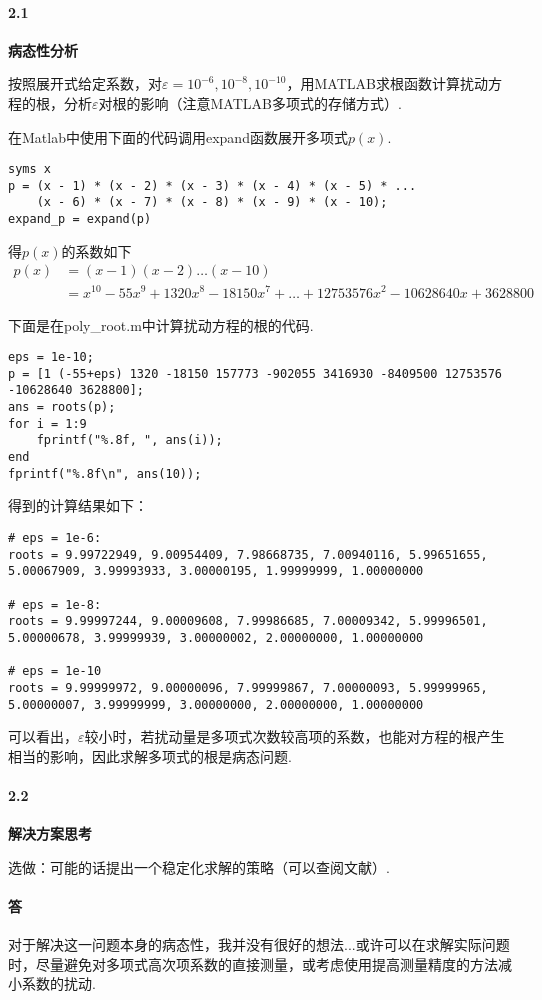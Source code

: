 \paragraph{2.1} \textbf{病态性分析}
\par 按照展开式给定系数，对$\varepsilon = 10^{-6}, 10^{-8}, 10^{-10}$，用MATLAB求根函数计算扰动方程的根，分析$\varepsilon$对根的影响（注意MATLAB多项式的存储方式）.
\par 在Matlab中使用下面的代码调用expand函数展开多项式$p(x)$.
\begin{lstlisting}
syms x
p = (x - 1) * (x - 2) * (x - 3) * (x - 4) * (x - 5) * ...
    (x - 6) * (x - 7) * (x - 8) * (x - 9) * (x - 10);
expand_p = expand(p)
\end{lstlisting}
\par 得$p(x)$的系数如下
\[\begin{split}
p(x) & = (x - 1)(x - 2)\dots(x - 10) \\
& = x^{10} - 55 x^9 + 1320 x^8 - 18150 x^7 + \dots + 12753576 x^2 - 10628640 x + 3628800
\end{split}\]
\par 下面是在poly\_root.m中计算扰动方程的根的代码.
\begin{lstlisting}
eps = 1e-10;
p = [1 (-55+eps) 1320 -18150 157773 -902055 3416930 -8409500 12753576 -10628640 3628800];
ans = roots(p);
for i = 1:9
    fprintf("%.8f, ", ans(i));
end
fprintf("%.8f\n", ans(10));
\end{lstlisting}
得到的计算结果如下：
\begin{lstlisting}
# eps = 1e-6:
roots = 9.99722949, 9.00954409, 7.98668735, 7.00940116, 5.99651655, 5.00067909, 3.99993933, 3.00000195, 1.99999999, 1.00000000

# eps = 1e-8:
roots = 9.99997244, 9.00009608, 7.99986685, 7.00009342, 5.99996501, 5.00000678, 3.99999939, 3.00000002, 2.00000000, 1.00000000

# eps = 1e-10
roots = 9.99999972, 9.00000096, 7.99999867, 7.00000093, 5.99999965, 5.00000007, 3.99999999, 3.00000000, 2.00000000, 1.00000000
\end{lstlisting}
可以看出，$\varepsilon$较小时，若扰动量是多项式次数较高项的系数，也能对方程的根产生相当的影响，因此求解多项式的根是病态问题.

\paragraph{2.2} \textbf{解决方案思考}
\par 选做：可能的话提出一个稳定化求解的策略（可以查阅文献）.
\paragraph{答} 对于解决这一问题本身的病态性，我并没有很好的想法...或许可以在求解实际问题时，尽量避免对多项式高次项系数的直接测量，或考虑使用提高测量精度的方法减小系数的扰动.

